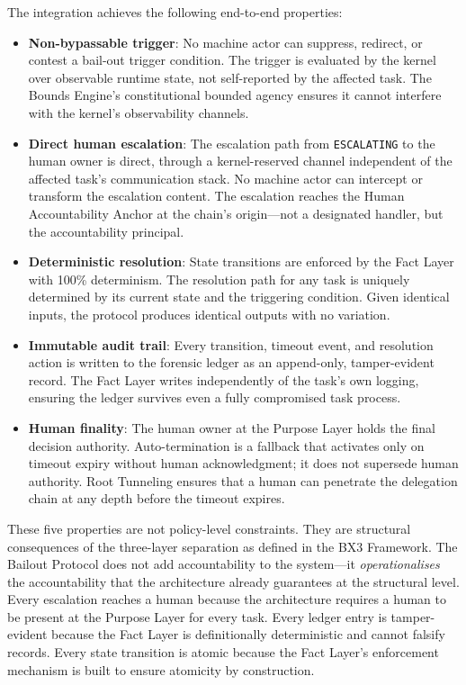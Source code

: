 The integration achieves the following end-to-end properties:

\begin{itemize}
\item \textbf{Non-bypassable trigger}: No machine actor can suppress, redirect, or contest a bail-out trigger condition. The trigger is evaluated by the kernel over observable runtime state, not self-reported by the affected task. The Bounds Engine's constitutional bounded agency ensures it cannot interfere with the kernel's observability channels.

\item \textbf{Direct human escalation}: The escalation path from \texttt{ESCALATING} to the human owner is direct, through a kernel-reserved channel independent of the affected task's communication stack. No machine actor can intercept or transform the escalation content. The escalation reaches the Human Accountability Anchor at the chain's origin---not a designated handler, but the accountability principal.

\item \textbf{Deterministic resolution}: State transitions are enforced by the Fact Layer with 100\% determinism. The resolution path for any task is uniquely determined by its current state and the triggering condition. Given identical inputs, the protocol produces identical outputs with no variation.

\item \textbf{Immutable audit trail}: Every transition, timeout event, and resolution action is written to the forensic ledger as an append-only, tamper-evident record. The Fact Layer writes independently of the task's own logging, ensuring the ledger survives even a fully compromised task process.

\item \textbf{Human finality}: The human owner at the Purpose Layer holds the final decision authority. Auto-termination is a fallback that activates only on timeout expiry without human acknowledgment; it does not supersede human authority. Root Tunneling ensures that a human can penetrate the delegation chain at any depth before the timeout expires.
\end{itemize}

These five properties are not policy-level constraints. They are structural consequences of the three-layer separation as defined in the BX3 Framework. The Bailout Protocol does not add accountability to the system---it \textit{operationalises} the accountability that the architecture already guarantees at the structural level. Every escalation reaches a human because the architecture requires a human to be present at the Purpose Layer for every task. Every ledger entry is tamper-evident because the Fact Layer is definitionally deterministic and cannot falsify records. Every state transition is atomic because the Fact Layer's enforcement mechanism is built to ensure atomicity by construction.

